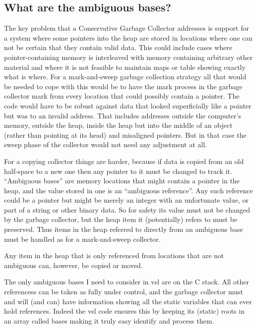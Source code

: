 \subsection{What are the ambiguous bases?}
The key problem that a Conservative Garbage Collector addresses is
support for a system where some pointers into the heap are stored in
locations where one can not be certain that they contain valid data. This
could include cases where pointer-containing memory is interleaved
with memory containing arbitrary other material and where it is not feasible
to maintain maps or table showing exactly what is where. For a mark-and-sweep
garbage collection strategy all that would be needed to cope with this would
be to have the mark process in the garbage collector mark from every
location that could possibly contain a pointer. The code would have to be
robust against data that looked superficially like a pointer but was to an
invalid address. That includes addresses outside the computer's memory,
outside the heap, inside the heap but into the middle of an object (rather
than pointing at its head) and misaligned pointers. But in that case
the sweep phase of the collector would not need any adjustment at all.

For a copying collector things are harder, because if data is copied
from an old half-space to a new one then any pointer to it must be changed
to track it. ``Ambiguous bases'' are memory locations that might contain
a pointer in the heap, and the value stored in one is an ``ambiguous
reference''. Any such reference could be a pointer but might be
merely an integer with an unfortunate value, or part of a string or
other binary data. So for safety its value must not be changed by the
garbage collector, but the heap item it (potentially) refers to must be
preserved. Thus items in the heap referred to directly from an
ambiguous base must be handled as for a mark-and-sweep collector.

Any item in the heap that is only referenced from locations that are
not ambiguous can, however, be copied or moved.

The only ambiguous bases I need to consider in {\tx vsl} are on the
C stack. All other referencess can be taken as fully under control, and the
garbage collector must and will (and can) have information showing all
the static variables that can ever hold references. Indeed the {\tx vsl}
code ensures this by keeping its (static) roots in an array called
{\tx bases} making it truly easy identify and process them.

